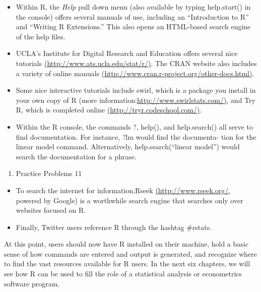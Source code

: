 \documentclass[
]{book}
\providecommand{\tightlist}{%
  \setlength{\itemsep}{0pt}\setlength{\parskip}{0pt}}
\begin{document}
\begin{itemize}
\tightlist
\item
  Within R, the \emph{Help} pull down menu (also available by typing help.start() in the console) offers several manuals of use, including an ``Introduction to R'' and ``Writing R Extensions.'' This also opens an HTML-based search engine of the help files.
\item
  UCLA's Institute for Digital Research and Education offers several nice tutorials \href{http://www.ats.ucla.edu/stat/r/}{(http://www.ats.ucla.edu/stat/r/)}. The CRAN website also includes a variety of online manuals \href{http://www.cran.r-project.org/other-docs.html}{(http://www.cran.r-project.org/other-docs.html)}.
\item
  Some nice interactive tutorials include swirl, which is a package you install in your own copy of R (more information:\href{http://www.swirlstats.com/}{http://www.swirlstats.com/)}, and Try R, which is completed online \href{http://tryr.codeschool.com/}{(http://tryr.codeschool.com/)}.
\item
  Within the R console, the commands ?, help(), and help.search() all serve to find documentation. For instance, ?lm would find the documenta- tion for the linear model command. Alternatively, help.search(``linear model'') would search the documentation for a phrase.
\end{itemize}

\begin{enumerate}
\def\labelenumi{\arabic{enumi}.}
\setcounter{enumi}{5}
\tightlist
\item
  Practice Problems 11
\end{enumerate}

\begin{itemize}
\tightlist
\item
  To search the internet for information,Rseek \href{http://www.rseek.org/}{(http://www.rseek.org/,} powered by Google) is a worthwhile search engine that searches only over websites focused on R.
\item
  Finally, Twitter users reference R through the hashtag \#rstats.
\end{itemize}

At this point, users should now have R installed on their machine, hold a basic sense of how commands are entered and output is generated, and recognize where to find the vast resources available for R users. In the next six chapters, we will see how R can be used to fill the role of a statistical analysis or econometrics software program.
\end{document}
